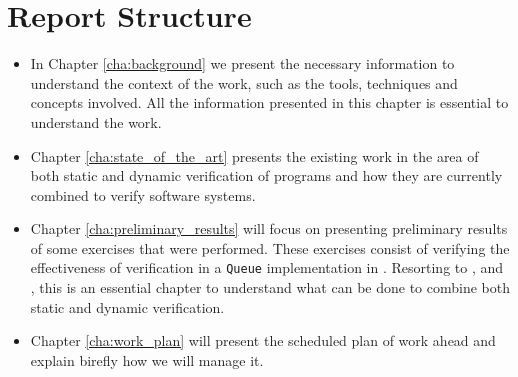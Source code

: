 \section{Report Structure}
\label{sec:report_structure}

\begin{itemize}
    \item In Chapter \ref{cha:background} we present the necessary information to understand
        the context of the work, such as the tools, techniques and concepts involved. All 
        the information presented in this chapter is essential to understand the work.
    \item Chapter \ref{cha:state_of_the_art} presents the existing work in the area of 
        both static and dynamic verification of \ocaml programs and how they are currently 
        combined to verify software systems.
    \item Chapter \ref{cha:preliminary_results} will focus on presenting preliminary 
        results of some exercises that were performed. These exercises consist of verifying 
        the effectiveness of verification in a \texttt{Queue} implementation in \ocaml. 
        Resorting to \gospellang, \cameleer and \ortac, this is an essential chapter to understand 
        what can be done to combine both static and dynamic verification.
    \item Chapter \ref{cha:work_plan} will present the scheduled plan of work ahead and explain 
    birefly how we will manage it.
\end{itemize}